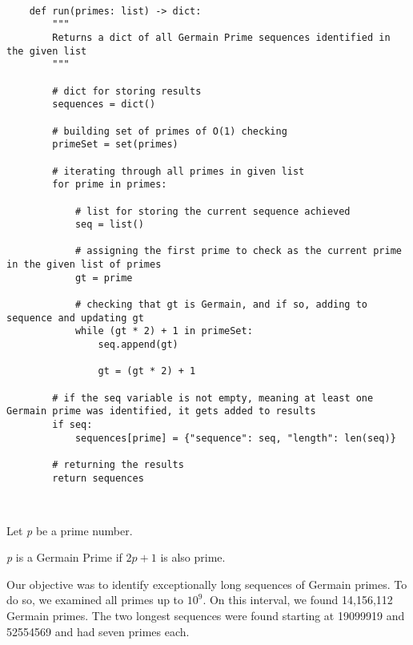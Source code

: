 \documentclass[11pt]{article}
\begin{document}
	
\lstset{style = Germain}

\begin{lstlisting}
	
	def run(primes: list) -> dict:
		"""
		Returns a dict of all Germain Prime sequences identified in the given list
		"""
	
		# dict for storing results
		sequences = dict()
		
		# building set of primes of O(1) checking
		primeSet = set(primes)
		
		# iterating through all primes in given list
		for prime in primes:
		
			# list for storing the current sequence achieved
			seq = list()
			
			# assigning the first prime to check as the current prime in the given list of primes
			gt = prime
			
			# checking that gt is Germain, and if so, adding to sequence and updating gt
			while (gt * 2) + 1 in primeSet:
				seq.append(gt)
				
				gt = (gt * 2) + 1
		
		# if the seq variable is not empty, meaning at least one Germain prime was identified, it gets added to results
		if seq:
			sequences[prime] = {"sequence": seq, "length": len(seq)}
		
		# returning the results
		return sequences

		
\end{lstlisting}


Let \textit{p} be a prime number.

\textit{p} is a Germain Prime if $2\textit{p}+1$ is also prime.

Our objective was to identify exceptionally long sequences of Germain primes. To do so, we examined all primes up to $10^9$. On this interval, we found 14,156,112 Germain primes. The two longest sequences were found starting at 19099919 and 52554569 and had seven primes each.
\end{document}
